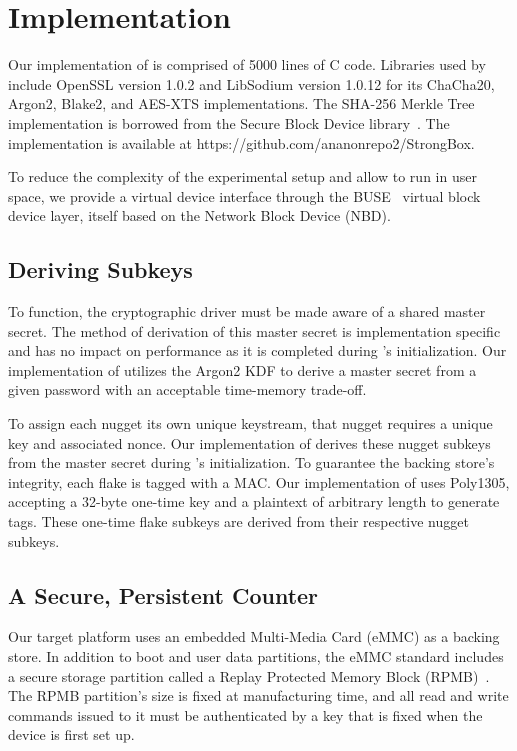 \chapter{\SYSTEM{} Implementation} \label{sec:implementation}

Our implementation of \SYSTEM{} is comprised of 5000 lines of C code. Libraries
used by \SYSTEM{} include OpenSSL version 1.0.2 and LibSodium version 1.0.12 for
its ChaCha20, Argon2, Blake2, and AES-XTS implementations. The SHA-256 Merkle
Tree implementation is borrowed from the Secure Block Device library~\cite{SBD}.
The implementation is available at https://github.com/ananonrepo2/StrongBox.

To reduce the complexity of the experimental setup and allow \SYSTEM{}
to run in user space, we provide a virtual device interface through
the BUSE~\cite{BUSE} virtual block device layer, itself based on the
Network Block Device (NBD).

\section{Deriving Subkeys}
To function, the cryptographic driver must be made aware of a shared
master secret. The method of derivation of this master secret is
implementation specific and has no impact on performance as it is
completed during \SYSTEM{}'s initialization. Our implementation of
\SYSTEM{} utilizes the Argon2 KDF to derive a master secret from a
given password with an acceptable time-memory trade-off.

To assign each nugget its own unique keystream, that nugget requires a
unique key and associated nonce. Our implementation of \SYSTEM{}
derives these nugget subkeys from the master secret during \SYSTEM{}'s
initialization. To guarantee the backing store's integrity, each flake
is tagged with a MAC. Our implementation of \SYSTEM{} uses Poly1305,
accepting a 32-byte one-time key and a plaintext of arbitrary length
to generate tags. These one-time flake subkeys are derived from their
respective nugget subkeys.

\section{A Secure, Persistent Counter} 

Our target platform uses an embedded Multi-Media Card (eMMC) as a backing store. In
addition to boot and user data partitions, the eMMC standard includes a secure storage
partition called a Replay Protected Memory Block (RPMB)~\cite{eMMC-standard}. The RPMB
partition's size is fixed at manufacturing time, and all read and write commands issued
to it must be authenticated by a key that is fixed when the device is first set up.

